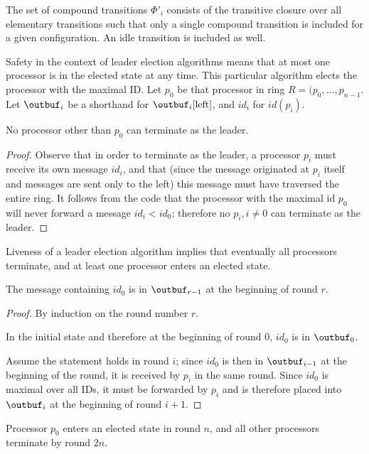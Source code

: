The set of compound transitions $\Phi'_i$ consists of the transitive closure over all elementary
transitions such that only a single compound transition is included for a given configuration. An
idle transition is included as well.

Safety in the context of leader election algorithms means that at most one processor is in the
elected state at any time. This particular algorithm elects the processor with the maximal ID.
Let $p_0$ be that processor in ring $R = (p_0, \ldots, p_{n-1}$. Let $\outbuf_i$ be a shorthand for
$\outbuf_i[\text{left}]$, and $id_i$ for $id(p_i)$.

\begin{theorem}
No processor other than $p_0$ can terminate as the leader.
\end{theorem}

\begin{proof}
Observe that in order to terminate as the leader, a processor $p_i$ must receive its own message
$id_i$, and that (since the message originated at $p_i$ itself and messages are sent only to the left)
this message must have traversed the entire ring. It follows from the code that the processor with
the maximal id $p_0$ will never forward a message $id_i < id_0$; therefore no $p_i, i \neq 0$ can
terminate as the leader.
\end{proof}

Liveness of a leader election algorithm implies that eventually all processors terminate, and
at least one processor enters an elected state.

\begin{lemma}
The message containing $id_0$ is in $\outbuf_{r-1}$ at the beginning of round $r$.
\end{lemma}

\begin{proof} \label{lemma:le-liveness}
By induction on the round number $r$.

In the initial state and therefore at the beginning of round $0$, $id_0$ is in $\outbuf_0$.

Assume the statement holds
in round $i$; since $id_0$ is then in $\outbuf_{i-1}$ at the beginning of the round, it is received
by $p_i$ in the same round. Since $id_0$ is maximal over all IDs, it must be forwarded by $p_i$
and is therefore placed into $\outbuf_i$ at the beginning of round $i + 1$.
\end{proof}

\begin{theorem}
Processor $p_0$ enters an elected state in round $n$, and all other processors terminate
by round $2n$.
\end{theorem}

